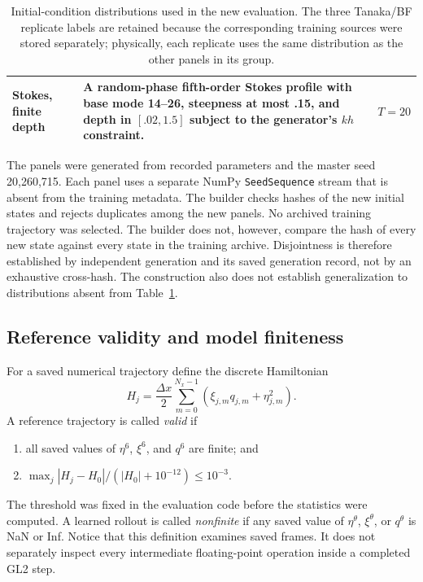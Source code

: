 \documentclass[11pt]{article}
\begin{document}
\begin{table}[htbp]
\begin{tabularx}{\textwidth}{p{}X p{}}
Stokes, finite depth
& A random-phase fifth-order Stokes profile with base mode 14--26, steepness at
most .15, and depth in $[.02,1.5]$ subject to the generator's $kh$ constraint.
& $T=20$ \\
\bottomrule
\end{tabularx}
\caption{Initial-condition distributions used in the new evaluation.  The
three Tanaka/BF replicate labels are retained because the corresponding
training sources were stored separately; physically, each replicate uses the
same distribution as the other panels in its group.}
\label{tab:ic-families}
\end{table}

The panels were generated from recorded parameters and the master seed
20,260,715.  Each panel uses a separate NumPy \texttt{SeedSequence} stream
that is absent from the training metadata.  The builder checks hashes of the
new initial states and rejects duplicates among the new panels.  No archived
training trajectory was selected.  The builder does not, however, compare
the hash of every new state against every state in the training archive.
Disjointness is therefore established by independent generation and its saved
generation record, not by an exhaustive cross-hash.  The construction also does not
establish generalization to distributions absent from
Table~\ref{tab:ic-families}.

\subsection{Reference validity and model finiteness}

For a saved numerical trajectory define the discrete Hamiltonian
\begin{equation}
  H_j=\frac{\Delta x}{2}\sum_{m=0}^{N_x-1}
  \left(\xi_{j,m}q_{j,m}+\eta_{j,m}^2\right).
  \label{eq:discrete-H}
\end{equation}
A reference trajectory is called \emph{valid} if
\begin{enumerate}[leftmargin=*]
  \item all saved values of $\eta^6$, $\xi^6$, and $q^6$ are finite; and
  \item $\max_j |H_j-H_0|/(|H_0|+10^{-12})\leq10^{-3}$.
\end{enumerate}
The threshold was fixed in the evaluation code before the statistics were
computed.  A learned rollout is called \emph{nonfinite} if any saved value of
$\eta^\theta$, $\xi^\theta$, or $q^\theta$ is NaN or Inf.  Notice that this
definition examines saved frames.  It does not separately inspect every
intermediate floating-point operation inside a completed GL2 step.
\end{document}
